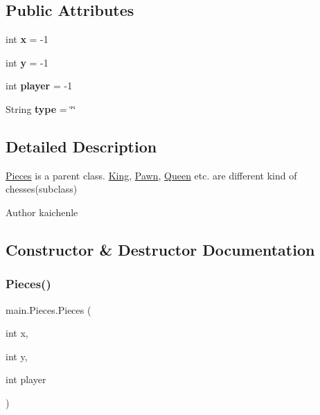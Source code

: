 \subsection*{Public Attributes}
\begin{DoxyCompactItemize}
\item 
\mbox{\label{classmain_1_1_pieces_ab7c9b25dca64d565c9660381f35a7d1b}} 
int {\bfseries x} = -\/1
\item 
\mbox{\label{classmain_1_1_pieces_a8da9a1ccb36051e345943c7f20d257f3}} 
int {\bfseries y} = -\/1
\item 
\mbox{\label{classmain_1_1_pieces_a04cbc94744f8532a295e2bf0201e18fa}} 
int {\bfseries player} = -\/1
\item 
\mbox{\label{classmain_1_1_pieces_a80df8799af3282b704681e9c1b3eb37f}} 
String {\bfseries type} = \char`\"{}\char`\"{}
\end{DoxyCompactItemize}


\subsection{Detailed Description}
\mbox{\hyperlink{classmain_1_1_pieces}{Pieces}} is a parent class. \mbox{\hyperlink{classmain_1_1_king}{King}}, \mbox{\hyperlink{classmain_1_1_pawn}{Pawn}}, \mbox{\hyperlink{classmain_1_1_queen}{Queen}} etc. are different kind of chesses(subclass) \begin{DoxyAuthor}{Author}
kaichenle 
\end{DoxyAuthor}


\subsection{Constructor \& Destructor Documentation}
\mbox{\label{classmain_1_1_pieces_aa626e806bdd56045f481edb81dc217dd}} 
\subsubsection{\texorpdfstring{Pieces()}{Pieces()}}
{\footnotesize\ttfamily main.\+Pieces.\+Pieces (\begin{DoxyParamCaption}\item[{int}]{x,  }\item[{int}]{y,  }\item[{int}]{player }\end{DoxyParamCaption})\hspace{0.3cm}{\ttfamily [inline]}}

